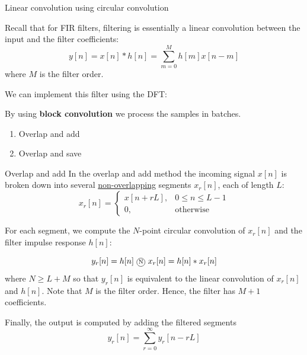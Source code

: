 \documentclass[10pt]{beamer}
\begin{document}
\begin{frame}{Linear convolution using circular convolution}

	Recall that for FIR filters, filtering is essentially a linear convolution between the input and the filter coefficients:
	\begin{equation*}
		y[n] = x[n] \ast h[n] = \sum_{m =0}^{M} h[m]x[n-m]
	\end{equation*}
	where $M$ is the filter order.
	
	\vspace{0.25cm}
	We can implement this filter using the DFT:
	\begin{center}
		\resizebox{0.8\textwidth}{!}{}
	\end{center}

	By using \textbf{block convolution} we process the samples in batches.
	\begin{enumerate}
		\item Overlap and add
		\item Overlap and save
	\end{enumerate}
\end{frame}


\begin{frame}{Overlap and add}
In the overlap and add method the incoming signal $x[n]$ is broken down into several \underline{non-overlapping} segments $x_r[n]$, each of length $L$:
\begin{equation*}
	x_r[n] = \begin{cases}
	x[n + rL], & 0 \leq n \leq L-1\\
	0, & \text{otherwise}
	\end{cases}
\end{equation*}

For each segment, we compute the $N$-point circular convolution of $x_r[n]$ and the filter impulse response $h[n]$:

\begin{equation*}
	y_r[n] = h[n]~\encircle{N}~x_r[n] = h[n]\ast x_r[n]
\end{equation*}
where $N \geq L + M$ so that $y_r[n]$ is equivalent to the linear convolution of $x_r[n]$ and $h[n]$. Note that $M$ is the filter order. Hence, the filter has $M+1$ coefficients.

Finally, the output is computed by adding the filtered segments
\begin{equation*}
	y_r[n] = \sum_{r = 0}^{\infty} y_r[n - rL]
\end{equation*}
\end{frame}
\end{document}
